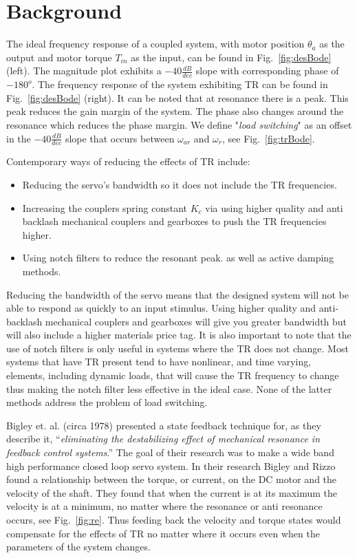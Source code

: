 \section{Background}\label{sec:back}
The ideal frequency response of a coupled system, with motor position $\theta_a$ as the output and motor torque $T_{in}$ as the input, can be found in Fig.~\ref{fig:desBode} (left). 
The magnitude plot exhibits a $-40\frac{dB}{dec}$ slope with corresponding phase of $-180^o$.
The frequency response of the system exhibiting TR can be found in Fig.~\ref{fig:desBode} (right). 
It can be noted that at resonance there is a peak. This peak reduces the gain margin of the system. The phase also changes around the resonance which reduces the phase margin.  
We define "\textit{load switching}" as an offset in the $-40\frac{dB}{dec}$ slope that occurs between $\omega_{ar}$ and $\omega_r$, see Fig.~\ref{fig:trBode}.

Contemporary ways of reducing the effects of TR include:
\begin{itemize}
\item Reducing the servo's bandwidth so it does not include the TR frequencies. 
\item Increasing the couplers spring constant $K_c$ via using higher quality and anti backlash mechanical couplers and gearboxes to push the TR frequencies higher. 
\item Using notch filters to reduce the resonant peak. as well as active damping methods\cite{5730488}.   
\end{itemize}

Reducing the bandwidth of the servo means that the designed system will not be able to respond as quickly to an input stimulus. Using higher quality and anti-backlash mechanical couplers and gearboxes will give you greater bandwidth but will also include a higher materials price tag. It is also important to note that the use of notch filters is only useful in systems where the TR does not change. Most systems that have TR present tend to have nonlinear, and time varying, elements, including dynamic loads, that will cause the TR frequency to change thus making the notch filter less effective in the ideal case.  None of the latter methods address the problem of load switching.

Bigley et. al.\cite{bigley1978resonance} (circa 1978) presented a state feedback technique for, as they describe it, ``\textit{eliminating the destabilizing effect of mechanical resonance in feedback control systems}.''  The goal of their research was to make a wide band high performance closed loop servo system. In their research Bigley and Rizzo found a relationship between the torque, or current, on the DC motor and the velocity of the shaft. They found that when the current is at its maximum the velocity is at a minimum, no matter where the resonance or anti resonance occurs, see Fig.~\ref{fig:re}. Thus feeding back the velocity and torque states would compensate for the effects of TR no matter where it occurs even when the parameters of the system changes.

